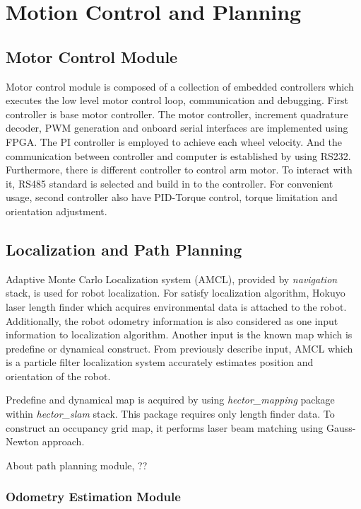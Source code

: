 \documentclass{llncs}
\begin{document}
\section{Motion Control and Planning}

\subsection{Motor Control Module}

Motor control module is composed of a collection of embedded controllers which executes the low level motor control loop, communication and debugging. First controller is base motor controller. The motor controller, increment quadrature decoder, PWM generation and onboard serial interfaces are implemented using FPGA. The PI controller is employed to achieve each wheel velocity. And the communication between controller and computer is established by using RS232. Furthermore, there is different controller to control arm motor. To interact with it, RS485 standard is selected and build in to the controller. For convenient usage, second controller also have PID-Torque control, torque limitation and orientation adjustment\cite{con_arm}. 

\subsection{Localization and Path Planning}

Adaptive Monte Carlo Localization system (AMCL), provided by \textit{navigation} stack, is used for robot localization. For satisfy localization algorithm, Hokuyo laser length finder which acquires environmental data is attached to the robot. Additionally, the robot odometry information is also considered as one input information to localization algorithm. Another input is the known map which is predefine or dynamical construct. From previously describe input, AMCL which is a particle filter localization system accurately estimates position and orientation of the robot.

Predefine and dynamical map is acquired by using \textit{hector\_mapping} package within \textit{hector\_slam} stack. This package requires only length finder data. To construct an occupancy grid map, it performs laser beam matching using Gauss-Newton approach\cite{hector_slam}.

About path planning module, ??

\subsubsection{Odometry Estimation Module}
\end{document}
